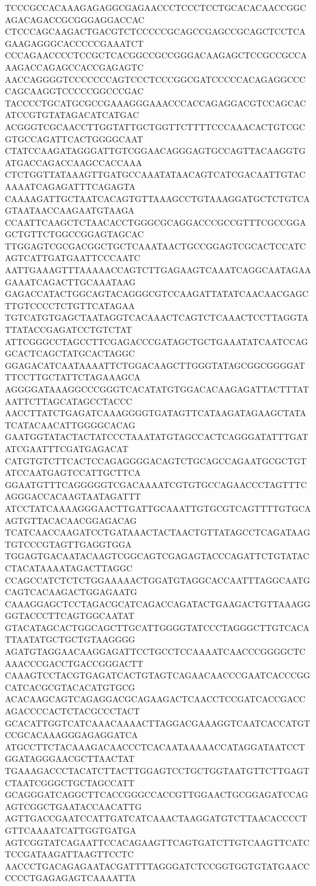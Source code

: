 TCCCGCCACAAAGAGAGGCGAGAACCCTCCCTCCTGCACACAACCGGCAGACAGACCGCGGGAGGACCAC
CTCCCAGCAAGACTGACGTCTCCCCCGCAGCCGAGCCGCAGCTCCTCAGAAGAGGGCACCCCCGAAATCT
CCCAGAACCCCTCCGCTCACGGCCGCCGGGACAAGAGCTCCGCCGCCAAAGACCAGAGCCACCGAGAGTC
AACCAGGGGTCCCCCCCAGTCCCTCCCGGCGATCCCCCACAGAGGCCCCAGCAAGGTCCCCCGGCCCGAC
TACCCCTGCATGCGCCGAAAGGGAAACCCACCAGAGGACGTCCAGCACATCCGTGTATAGACATCATGAC
ACGGGTCGCAACCTTGGTATTGCTGGTTCTTTTCCCAAACACTGTCGCGTGCCAGATTCACTGGGGCAAT
CTATCCAAGATAGGGATTGTCGGAACAGGGAGTGCCAGTTACAAGGTGATGACCAGACCAAGCCACCAAA
CTCTGGTTATAAAGTTGATGCCAAATATAACAGTCATCGACAATTGTACAAAATCAGAGATTTCAGAGTA
CAAAAGATTGCTAATCACAGTGTTAAAGCCTGTAAAGGATGCTCTGTCAGTAATAACCAAGAATGTAAGA
CCAATTCAAGCTCTAACACCTGGGCGCAGGACCCGCCGTTTCGCCGGAGCTGTTCTGGCCGGAGTAGCAC
TTGGAGTCGCGACGGCTGCTCAAATAACTGCCGGAGTCGCACTCCATCAGTCATTGATGAATTCCCAATC
AATTGAAAGTTTAAAAACCAGTCTTGAGAAGTCAAATCAGGCAATAGAAGAAATCAGACTTGCAAATAAG
GAGACCATACTGGCAGTACAGGGCGTCCAAGATTATATCAACAACGAGCTTGTCCCCTCTGTTCATAGAA
TGTCATGTGAGCTAATAGGTCACAAACTCAGTCTCAAACTCCTTAGGTATTATACCGAGATCCTGTCTAT
ATTCGGGCCTAGCCTTCGAGACCCGATAGCTGCTGAAATATCAATCCAGGCACTCAGCTATGCACTAGGC
GGAGACATCAATAAAATTCTGGACAAGCTTGGGTATAGCGGCGGGGATTTCCTTGCTATTCTAGAAAGCA
AGGGGATAAAGGCCCGGGTCACATATGTGGACACAAGAGATTACTTTATAATTCTTAGCATAGCCTACCC
AACCTTATCTGAGATCAAAGGGGTGATAGTTCATAAGATAGAAGCTATATCATACAACATTGGGGCACAG
GAATGGTATACTACTATCCCTAAATATGTAGCCACTCAGGGATATTTGATATCGAATTTCGATGAGACAT
CATGTGTCTTCACTCCAGAGGGGACAGTCTGCAGCCAGAATGCGCTGTATCCAATGAGTCCATTGCTTCA
GGAATGTTTCAGGGGGTCGACAAAATCGTGTGCCAGAACCCTAGTTTCAGGGACCACAAGTAATAGATTT
ATCCTATCAAAAGGGAACTTGATTGCAAATTGTGCGTCAGTTTTGTGCAAGTGTTACACAACGGAGACAG
TCATCAACCAAGATCCTGATAAACTACTAACTGTTATAGCCTCAGATAAGTGTCCCGTAGTTGAGGTGGA
TGGAGTGACAATACAAGTCGGCAGTCGAGAGTACCCAGATTCTGTATACCTACATAAAATAGACTTAGGC
CCAGCCATCTCTCTGGAAAAACTGGATGTAGGCACCAATTTAGGCAATGCAGTCACAAGACTGGAGAATG
CAAAGGAGCTCCTAGACGCATCAGACCAGATACTGAAGACTGTTAAAGGGGTACCCTTCAGTGGCAATAT
GTACATAGCACTGGCAGCTTGCATTGGGGTATCCCTAGGGCTTGTCACATTAATATGCTGCTGTAAGGGG
AGATGTAGGAACAAGGAGATTCCTGCCTCCAAAATCAACCCGGGGCTCAAACCCGACCTGACCGGGACTT
CAAAGTCCTACGTGAGATCACTGTAGTCAGAACAACCCGAATCACCCGGCATCACGCGTACACATGTGCG
ACACAAGCAGTCAGAGGACGCAGAAGACTCAACCTCCGATCACCGACCAGACCCCACTCTACGCCCTACT
GCACATTGGTCATCAAACAAAACTTAGGACGAAAGGTCAATCACCATGTCCGCACAAAGGGAGAGGATCA
ATGCCTTCTACAAAGACAACCCTCACAATAAAAACCATAGGATAATCCTGGATAGGGAACGCTTAACTAT
TGAAAGACCCTACATCTTACTTGGAGTCCTGCTGGTAATGTTCTTGAGTCTAATCGGGCTGCTAGCCATT
GCAGGGATCAGGCTTCACCGGGCCACCGTTGGAACTGCGGAGATCCAGAGTCGGCTGAATACCAACATTG
AGTTGACCGAATCCATTGATCATCAAACTAAGGATGTCTTAACACCCCTGTTCAAAATCATTGGTGATGA
AGTCGGTATCAGAATTCCACAGAAGTTCAGTGATCTTGTCAAGTTCATCTCCGATAAGATTAAGTTCCTC
AACCCTGACAGAGAATACGATTTTAGGGATCTCCGGTGGTGTATGAACCCCCCTGAGAGAGTCAAAATTA
